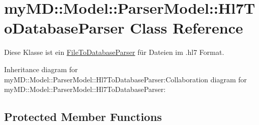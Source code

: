 \hypertarget{classmy_m_d_1_1_model_1_1_parser_model_1_1_hl7_to_database_parser}{
\section{my\-MD::Model::Parser\-Model::Hl7To\-Database\-Parser Class Reference}
\label{d5/d92/classmy_m_d_1_1_model_1_1_parser_model_1_1_hl7_to_database_parser}
}
Diese Klasse ist ein \hyperlink{classmy_m_d_1_1_model_1_1_parser_model_1_1_file_to_database_parser}{File\-To\-Database\-Parser} f\"{u}r Dateien im .hl7 Format.  


Inheritance diagram for my\-MD::Model::Parser\-Model::Hl7To\-Database\-Parser:Collaboration diagram for my\-MD::Model::Parser\-Model::Hl7To\-Database\-Parser:\subsection*{Protected Member Functions}
